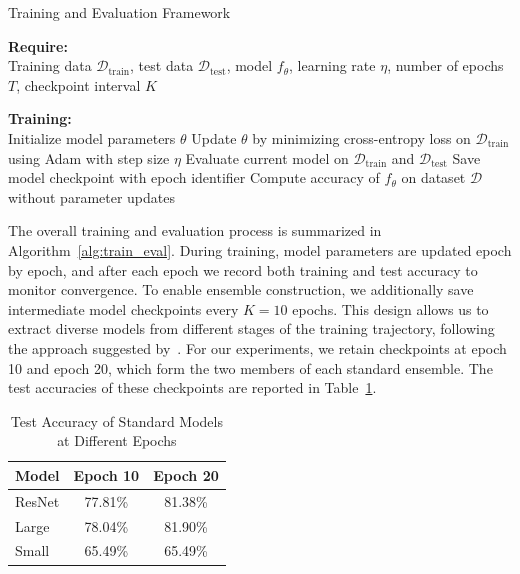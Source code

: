 \begin{algorithm}[H]
\caption{Training and Evaluation Framework}
\label{alg:train_eval}
\begin{algorithmic}
\State \textbf{Require:} \\ Training data $\mathcal{D}_{\text{train}}$, test data $\mathcal{D}_{\text{test}}$, model $f_\theta$, learning rate $\eta$, number of epochs $T$, checkpoint interval $K$

\State \textbf{Training:} \\ Initialize model parameters $\theta$
    \State Update $\theta$ by minimizing cross-entropy loss on $\mathcal{D}_{\text{train}}$ using Adam with step size $\eta$
    \State Evaluate current model on $\mathcal{D}_{\text{train}}$ and $\mathcal{D}_{\text{test}}$
        \State Save model checkpoint with epoch identifier
    \EndIf
\EndFor
\Statex
{}
    \State Compute accuracy of $f_\theta$ on dataset $\mathcal{D}$ without parameter updates
\EndFunction
\end{algorithmic}
\end{algorithm}


The overall training and evaluation process is summarized in Algorithm~\ref{alg:train_eval}. During training, model parameters are updated epoch by epoch, and after each epoch we record both training and test accuracy to monitor convergence.  
To enable ensemble construction, we additionally save intermediate model checkpoints every $K=10$ epochs.  
This design allows us to extract diverse models from different stages of the training trajectory, following the approach suggested by~\cite{fort2024ensemble}.  
For our experiments, we retain checkpoints at epoch 10 and epoch 20, which form the two members of each standard ensemble.  
The test accuracies of these checkpoints are reported in Table~\ref{tab:standard_acc}.

\begin{table}[H]
\centering
\caption{Test Accuracy of Standard Models at Different Epochs}
\label{tab:standard_acc}
\begin{tabular}{lcc}
\toprule
Model & Epoch 10 & Epoch 20 \\
\midrule
ResNet & 77.81\% & 81.38\% \\
Large  & 78.04\% & 81.90\% \\
Small  & 65.49\% & 65.49\% \\
\bottomrule
\end{tabular}
\end{table}


